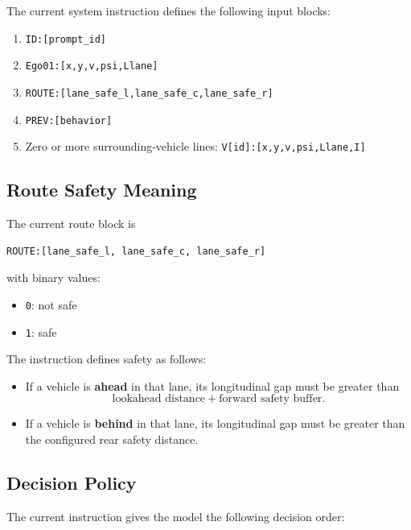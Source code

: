 \documentclass[11pt]{article}
\begin{document}
The current system instruction defines the following input blocks:

\begin{enumerate}
    \item \texttt{ID:[prompt\_id]}
    \item \texttt{Ego01:[x,y,v,psi,Llane]}
    \item \texttt{ROUTE:[lane\_safe\_l,lane\_safe\_c,lane\_safe\_r]}
    \item \texttt{PREV:[behavior]}
    \item Zero or more surrounding-vehicle lines:
    \texttt{V[id]:[x,y,v,psi,Llane,I]}
\end{enumerate}

\subsection{Route Safety Meaning}

The current route block is

\begin{lstlisting}[style=codestyle]
ROUTE:[lane_safe_l, lane_safe_c, lane_safe_r]
\end{lstlisting}

with binary values:

\begin{itemize}
    \item \texttt{0}: not safe
    \item \texttt{1}: safe
\end{itemize}

The instruction defines safety as follows:

\begin{itemize}
    \item If a vehicle is \textbf{ahead} in that lane, its longitudinal gap
    must be greater than
    \[
    \text{lookahead distance} + \text{forward safety buffer}.
    \]
    \item If a vehicle is \textbf{behind} in that lane, its longitudinal gap
    must be greater than the configured rear safety distance.
\end{itemize}

\subsection{Decision Policy}

The current instruction gives the model the following decision order:
\end{document}
